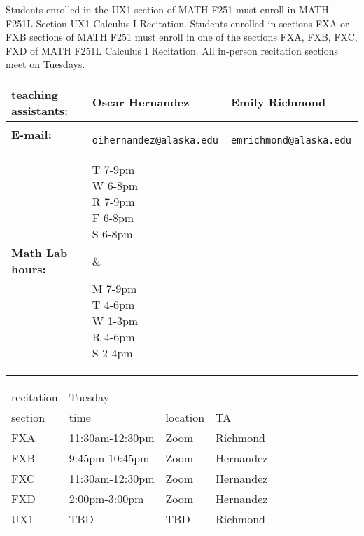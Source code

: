 \documentclass[11pt,fleqn]{article}
\begin{document}
Students enrolled in the UX1 section of MATH F251 must enroll in MATH F251L Section UX1 Calculus I Recitation. Students enrolled in sections FXA or FXB sections of MATH F251 must enroll in one of the sections FXA, FXB, FXC, FXD of MATH F251L  Calculus I Recitation. All in-person recitation sections meet on Tuesdays.\\

\begin{tabular}{| l || l  |l| }
\hline
\textbf{teaching assistants:}&Oscar Hernandez 
& Emily Richmond\\
\hline 
\textbf{E-mail:}&\texttt{ oihernandez@alaska.edu} &\texttt{ emrichmond@alaska.edu} \\
\hline
\textbf{Math Lab hours:}&\parbox{1in}{\vspace{.5\baselineskip} T 7-9pm\\ W 6-8pm\\R 7-9pm\\ F 6-8pm\\ S 6-8pm \vspace{.5\baselineskip}} 
& \parbox{1in}{\vspace{.5\baselineskip}M 7-9pm\\ T 4-6pm\\ W 1-3pm\\R 4-6pm\\S 2-4pm\vspace{.5\baselineskip}}  \\
\hline
\end{tabular}

\bigskip

\begin{tabular}{| l | l | l | l |}
\hline
recitation & Tuesday&&\\
section & time & location & TA\\
\hline \hline
FXA&11:30am-12:30pm& Zoom & Richmond\\ \hline
FXB&9:45pm-10:45pm& Zoom& Hernandez\\ \hline
FXC&11:30am-12:30pm& Zoom& Hernandez \\ \hline
FXD&2:00pm-3:00pm& Zoom& Hernandez \\ \hline
UX1&TBD& TBD & Richmond\\ \hline
\end{tabular} 
\vfill
\end{document}
